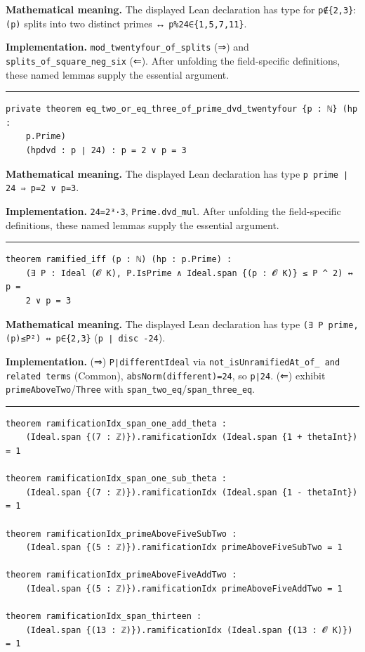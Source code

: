 \documentclass[UTF8,a4paper,11pt,fontset=fandol]{ctexart}
\theoremstyle{definition}
\newcommand{\statementsep}{\par\medskip\hrule\medskip}
\begin{document}
\noindent\textbf{Mathematical meaning.} The displayed Lean declaration has type for \texttt{p∉\{2,3\}}: \texttt{(p)} splits into two distinct primes ↔ \texttt{p\%24∈\{1,5,7,11\}}.\par
\noindent\textbf{Implementation.} \texttt{mod\_\allowbreak{}twentyfour\_\allowbreak{}of\_\allowbreak{}splits} (⇒) and \texttt{splits\_\allowbreak{}of\_\allowbreak{}square\_\allowbreak{}neg\_\allowbreak{}six} (⇐). After unfolding the field-specific definitions, these named lemmas supply the essential argument.\par
\statementsep
\begin{verbatim}
private theorem eq_two_or_eq_three_of_prime_dvd_twentyfour {p : ℕ} (hp :
    p.Prime)
    (hpdvd : p ∣ 24) : p = 2 ∨ p = 3
\end{verbatim}
\noindent\textbf{Mathematical meaning.} The displayed Lean declaration has type \texttt{p prime ∣ 24 ⇒ p=2 ∨ p=3}.\par
\noindent\textbf{Implementation.} \texttt{24=2³·3}, \texttt{Prime.\allowbreak{}dvd\_\allowbreak{}mul}. After unfolding the field-specific definitions, these named lemmas supply the essential argument.\par
\statementsep
\begin{verbatim}
theorem ramified_iff (p : ℕ) (hp : p.Prime) :
    (∃ P : Ideal (𝓞 K), P.IsPrime ∧ Ideal.span {(p : 𝓞 K)} ≤ P ^ 2) ↔ p =
    2 ∨ p = 3
\end{verbatim}
\noindent\textbf{Mathematical meaning.} The displayed Lean declaration has type \texttt{(∃ P prime, (p)≤P²) ↔ p∈\{2,3\}} (\texttt{p ∣ disc -24}).\par
\noindent\textbf{Implementation.} (⇒) \texttt{P∣differentIdeal} via \texttt{not\_\allowbreak{}isUnramifiedAt\_\allowbreak{}of\_\allowbreak{} and related terms} (Common), \texttt{absNorm(different)=24}, so \texttt{p∣24}. (⇐) exhibit \texttt{primeAboveTwo}/\texttt{Three} with \texttt{span\_\allowbreak{}two\_\allowbreak{}eq}/\texttt{span\_\allowbreak{}three\_\allowbreak{}eq}.\par
\statementsep
\begin{verbatim}
theorem ramificationIdx_span_one_add_theta :
    (Ideal.span {(7 : ℤ)}).ramificationIdx (Ideal.span {1 + thetaInt}) = 1

theorem ramificationIdx_span_one_sub_theta :
    (Ideal.span {(7 : ℤ)}).ramificationIdx (Ideal.span {1 - thetaInt}) = 1

theorem ramificationIdx_primeAboveFiveSubTwo :
    (Ideal.span {(5 : ℤ)}).ramificationIdx primeAboveFiveSubTwo = 1

theorem ramificationIdx_primeAboveFiveAddTwo :
    (Ideal.span {(5 : ℤ)}).ramificationIdx primeAboveFiveAddTwo = 1

theorem ramificationIdx_span_thirteen :
    (Ideal.span {(13 : ℤ)}).ramificationIdx (Ideal.span {(13 : 𝓞 K)}) = 1
\end{verbatim}
\end{document}
